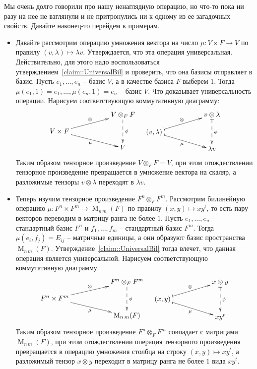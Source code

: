 Мы очень долго говорили про нашу ненаглядную операцию, но что-то пока ни разу на нее не взглянули и не притронулись ни к одному из ее загадочных свойств. Давайте  наконец-то перейдем к примерам.

\begin{itemize}
\item Давайте рассмотрим операцию умножения вектора на число $\mu \colon V\times F \to V$ по правилу $(v, \lambda)\mapsto \lambda v$. Утверждается, что эта операция универсальная. Действительно, для этого надо воспользоваться утверждением~\ref{claim::UniversalBil} и проверить, что она базисы отправляет в базис. Пусть $e_1,\ldots,e_n$ -- базис $V$, а в качестве базиса $F$ выберем $1$. Тогда $\mu(e_1, 1) = e_1, \ldots, \mu(e_n, 1) = e_n$ -- базис $V$. Что доказывает универсальность операции. Нарисуем соответствующую коммутативную диаграмму:
\[
\xymatrix@R=10pt{
	{}&{}&{V\otimes_F F}\ar@{-->}[dd]^{\phi}\\
	{V\times F}\ar[urr]^{\otimes}\ar[drr]_{\mu}&{}&{}\\
	{}&{}&{V}\\
}
\quad
\xymatrix@R=10pt{
	{}&{}&{v\otimes \lambda}\ar@{|-->}[dd]^{\phi}\\
	{(v,\lambda)}\ar@{|->}[urr]^{\otimes}\ar@{|->}[drr]_{\mu}&{}&{}\\
	{}&{}&{\lambda v}\\
}
\]
Таким образом тензорное произведение $V\otimes_F F = V$, при этом отождествлении тензорное произведение превращается в умножение вектора на скаляр, а разложимые тензоры $v\otimes \lambda$ переходят в $\lambda v$.

\item Теперь изучим тензорное произведение $F^n \otimes_F F^m$. Рассмотрим билинейную операцию $\mu\colon F^n\times F^m \to \operatorname{M}_{n\,m}(F) $ по правилу $(x, y)\mapsto xy^t$, то есть пару векторов переводим в матрицу ранга не более $1$. Пусть $e_1,\ldots,e_n$ -- стандартный базис $F^n$ и $f_1,\ldots,f_m$ -- стандартный базис $F^m$. Тогда $\mu(e_i, f_j) = E_{ij}$ -- матричные единицы, а они образуют базис пространства $\operatorname{M}_{n\,m}(F)$. Утверждение~\ref{claim::UniversalBil} тогда влечет, что данная операция является универсальной. Нарисуем соответствующую коммутативную диаграмму
\[
\xymatrix@R=10pt{
	{}&{}&{F^n\otimes_F F^m}\ar@{-->}[dd]^{\phi}\\
	{F^n\times F^m}\ar[urr]^{\otimes}\ar[drr]_{\mu}&{}&{}\\
	{}&{}&{\operatorname{M}_{n\,m}(F)}\\
}
\quad
\xymatrix@R=10pt{
	{}&{}&{x\otimes y}\ar@{|-->}[dd]^{\phi}\\
	{(x, y)}\ar@{|->}[urr]^{\otimes}\ar@{|->}[drr]_{\mu}&{}&{}\\
	{}&{}&{x y^t}\\
}
\]
Таким образом тензорное произведение $F^n \otimes_F F^m$ совпадает с матрицами $\operatorname{M}_{n\,m}(F)$, при этом отождествлении операция тензорного произведения превращается в операцию умножения столбца на строку $(x, y)\mapsto xy^t$, а разложимый тензор $x\otimes y$ переходит в матрицу ранга не более $1$ вида $xy^t$.


\end{itemize}
